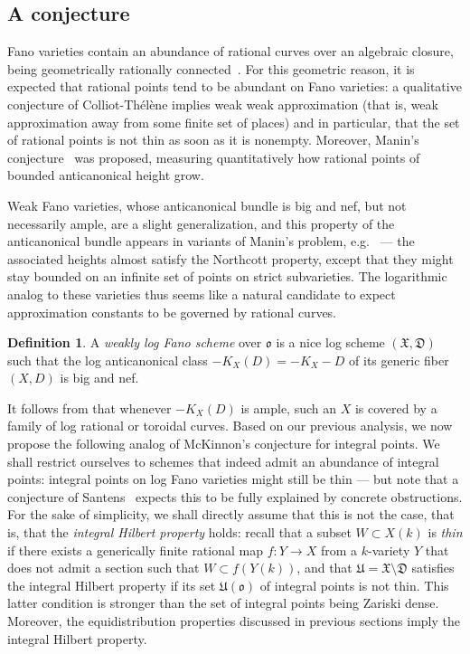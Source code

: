 \documentclass[a4paper, twoside, 11pt]{amsart}
\theoremstyle{definition}
\newtheorem{definition}[theorem]{Definition}
\newcommand{\mD}{\mathfrak{D}}
\newcommand{\mU}{\mathfrak{U}}
\newcommand{\mX}{\mathfrak{X}}
\newcommand{\fo}{\mathfrak{o}}
\begin{document}
	
\subsection{A conjecture}
Fano varieties contain an abundance of rational curves over an
algebraic closure, being geometrically rationally
connected~\cite{MR1191735,MR1158625}. For this geometric reason, it is expected that rational points tend to be abundant on Fano varieties: a qualitative conjecture
of Colliot-Thélène \cite[Conj.~14.1.2]{C-TSKbook} implies weak weak approximation (that is, weak approximation away from some finite set of places) and in
particular, that the set of rational points is not thin as soon as it is nonempty.
Moreover, Manin's conjecture~\cite{MR974910} was proposed, measuring quantitatively how rational points of bounded anticanonical height grow. 
 

Weak Fano varieties, whose anticanonical bundle is big and nef, but not necessarily ample,
are a slight generalization, and this property of the anticanonical bundle appears
in variants of Manin's problem, e.g.~\cite{MR4472281} --- the associated heights almost satisfy the Northcott property, except that they might stay bounded
on an infinite set of points on strict subvarieties.
The logarithmic analog to these varieties thus seems like a natural candidate to
expect approximation constants to be governed by rational curves.

\begin{definition}
	A \emph{weakly log Fano scheme} over $\fo$ is a nice log scheme $(\mX, \mD)$  such that the log anticanonical class $-K_X(D) = -K_X-D$ of its generic fiber $(X, D)$ is big and nef.
\end{definition}


 It follows from \cite[Cor.~5.4]{KeelMcKernan} that whenever $-K_X(D)$ is ample, such an $X$ is covered by a family of log rational or toroidal curves. Based on our previous analysis, we now propose the following analog of
 McKinnon's conjecture for integral points.
 We shall restrict ourselves to schemes that indeed admit an abundance of integral points:
 integral points on log Fano varieties might still be thin --- but note that
 a conjecture of Santens~\cite{Santens} expects this to be fully explained by concrete obstructions.
 For the sake of simplicity, we shall directly assume that this is not the case, that is, that the \emph{integral Hilbert property} holds:
 recall that a subset $W\subset X(k)$ is \emph{thin} if there exists a generically finite rational map $f\colon Y\to X$ from a $k$-variety $Y$ that does not admit a section such that $W\subset f(Y(k))$, and that $\mU = \mX\setminus \mD$ satisfies the integral Hilbert property if its set $\mU(\fo)$ of integral points is not thin. This latter condition is stronger than the set of integral points being Zariski dense. Moreover, the equidistribution properties discussed in previous sections imply the integral Hilbert property.
\end{document}
